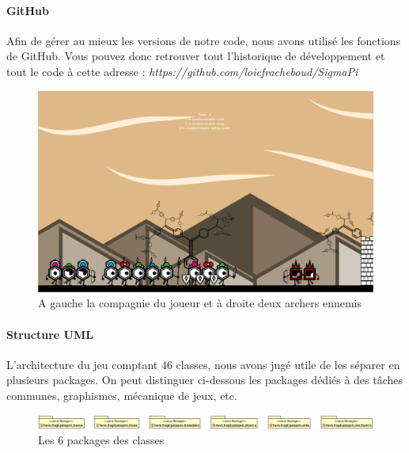 \documentclass[a4paper,10pt]{article}
\begin{document}
 \paragraph{GitHub}
Afin de gérer au mieux les versions de notre code, nous avons utilisé les fonctions de GitHub. Vous pouvez donc retrouver tout l'historique de développement et tout le code à cette adresse : {\itshape https://github.com/loicfracheboud/SigmaPi}
  \begin{figure}[!h]
 \centering
 \vspace{5pt}
 \includegraphics[scale=0.25]{images/menu}
 \caption{A gauche la compagnie du joueur et à droite deux archers ennemis}
 \end{figure}  
  \pagebreak
  
  \paragraph*{Structure UML}
  L'architecture du jeu comptant 46 classes, nous avons jugé utile de les séparer en plusieurs packages. On peut distinguer ci-dessous les packages dédiés à des tâches communes, graphismes, mécanique de jeux, etc.  
  
 \begin{figure}[!h]
 \centering
 \includegraphics[scale=0.32]{images/Complete}
 \caption{Les 6 packages des classes}
 \end{figure}
\end{document}
